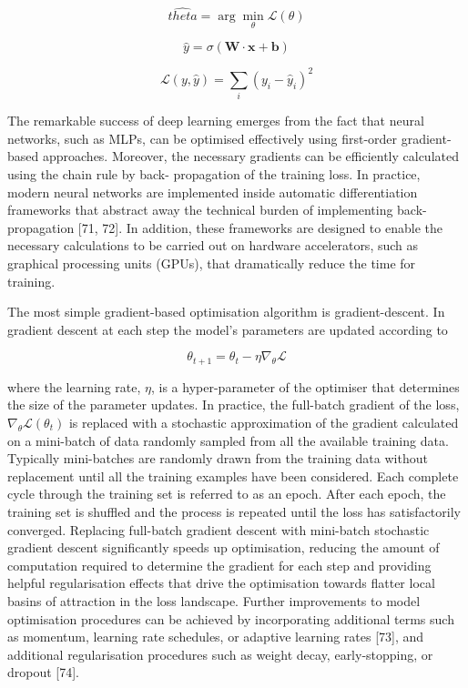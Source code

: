 \begin{equation}
    \hat{theta} = \arg\min_{\theta} \mathcal{L}(\theta)
\end{equation}

\begin{equation}
    \hat{y} = \sigma(\mathbf{W} \cdot \mathbf{x} + \mathbf{b})
\end{equation}

\begin{equation}
    \mathcal{L}(y, \hat{y}) = \sum_{i}(y_i - \hat{y}_i)^{2}
\end{equation}

The remarkable success of deep learning emerges from the fact that neural networks, such as MLPs, can be optimised effectively using first-order gradient-based approaches. Moreover, the necessary gradients can be efficiently calculated using the chain rule by back- propagation of the training loss. In practice, modern neural networks are implemented inside automatic differentiation frameworks that abstract away the technical burden of implementing back-propagation [71, 72]. In addition, these frameworks are designed to enable the necessary calculations to be carried out on hardware accelerators, such as graphical processing units (GPUs), that dramatically reduce the time for training.

The most simple gradient-based optimisation algorithm is gradient-descent. In gradient descent at each step the model’s parameters are updated according to

\begin{equation}
    \theta_{t+1} = \theta_t - \eta \nabla_{\theta} \mathcal{L}
\end{equation}

where the learning rate, $\eta$, is a hyper-parameter of the optimiser that determines the size of the parameter updates. In practice, the full-batch gradient of the loss, $\nabla_{\theta}\mathcal{L}(\theta_{t})$ is replaced with a stochastic approximation of the gradient calculated on a mini-batch of data randomly sampled from all the available training data. Typically mini-batches are randomly drawn from the training data without replacement until all the training examples have been considered. Each complete cycle through the training set is referred to as an epoch. After each epoch, the training set is shuffled and the process is repeated until the loss has satisfactorily converged. Replacing full-batch gradient descent with mini-batch stochastic gradient descent significantly speeds up optimisation, reducing the amount of computation required to determine the gradient for each step and providing helpful regularisation effects that drive the optimisation towards flatter local basins of attraction in the loss landscape. Further improvements to model optimisation procedures can be achieved by incorporating additional terms such as momentum, learning rate schedules, or adaptive learning rates [73], and additional regularisation procedures such as weight decay, early-stopping, or dropout [74].

